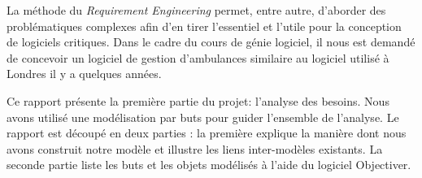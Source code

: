 La méthode du \textit{Requirement Engineering} permet, entre autre, 
d'aborder des problématiques complexes afin d'en tirer l'essentiel et l'utile pour la 
conception de logiciels critiques. Dans le cadre du cours de génie logiciel, il
nous est demandé de concevoir un logiciel de gestion d'ambulances similaire
au logiciel utilisé à Londres il y a quelques années.

Ce rapport présente la première partie du projet: l'analyse des besoins. Nous
avons utilisé une modélisation par buts pour guider l'ensemble de l'analyse.
Le rapport est découpé en deux parties : la première explique la manière
dont nous avons construit notre modèle et illustre les liens inter-modèles
existants. La seconde partie liste les buts et les objets modélisés à l'aide
du logiciel Objectiver.
